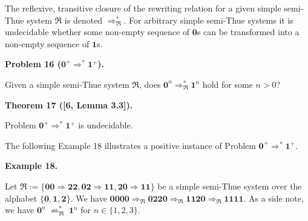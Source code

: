 \documentclass[10pt,a4paper]{amsart}
\begin{document}
 
 
The reflexive, transitive closure of the rewriting relation for a given simple semi-Thue system $\mathfrak{R}$ is denoted $\Rightarrow_{\mathfrak{R}}^{*}$. For arbitrary simple semi-Thue systems it is undecidable whether some non-empty sequence of $\mathbf{0}$s can be transformed into a non-empty sequence of $\mathbf{1}$s.\par
 
 
 
\par\medskip\noindent\textbf{Problem 16 ($\mathbf{0}^{+}\Rightarrow^{*}\mathbf{1}^{+}$).}\par
 
 
Given a simple semi-Thue system $\mathfrak{R}$, does $\mathbf{0}^{n}\Rightarrow^{*}_{\mathfrak{R}}\mathbf{1}^{n}$ hold for some $n>0$?\par
 
 
 
 
\par\medskip\noindent\textbf{Theorem 17 ([6, Lemma 3.3]).}\par
 
 
Problem $\mathbf{0}^{+}\Rightarrow^{*}\mathbf{1}^{+}$ is undecidable.\par
 
 
 
 
The following Example 18 illustrates a positive instance of Problem $\mathbf{0}^{+}\Rightarrow^{*}\mathbf{1}^{+}$.\par
 
 
 
\par\medskip\noindent\textbf{Example 18.}\par
 
 
Let $\mathfrak{R}:=\{\mathbf{0}\mathbf{0}\Rightarrow\mathbf{2}\mathbf{2},\mathbf{0}%
\mathbf{2}\Rightarrow\mathbf{1}\mathbf{1},\mathbf{2}\mathbf{0}\Rightarrow%
\mathbf{1}\mathbf{1}\}$ be a simple semi-Thue system over the alphabet $\{\mathbf{0},\mathbf{1},\mathbf{2}\}$. We have $\mathbf{0}\mathbf{0}\mathbf{0}\mathbf{0}\Rightarrow_{\mathfrak{R}}\mathbf{0}%
\mathbf{2}\mathbf{2}\mathbf{0}\Rightarrow_{\mathfrak{R}}\mathbf{1}\mathbf{1}%
\mathbf{2}\mathbf{0}\Rightarrow_{\mathfrak{R}}\mathbf{1}\mathbf{1}\mathbf{1}%
\mathbf{1}$. As a side note, we have $\mathbf{0}^{n}\;{\not\Rightarrow}_{\mathfrak{R}}^{*}\;\mathbf{1}^{n}$ for $n\in\{1,2,3\}$.\par
 
\end{document}
